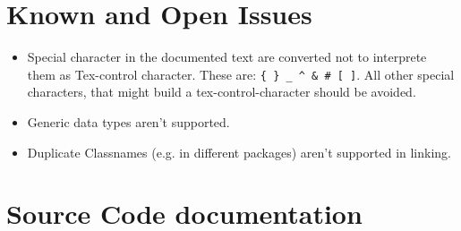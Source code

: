 \documentclass{article}
\begin{document}
\section{Known and Open Issues}
\begin{itemize}
	\item Special character in the documented text are converted not to interprete them as Tex-control character. These are:
\verb+{ } _ ^ & # [ ]+. All other special characters, that might build a tex-control-character should be avoided.
	\item Generic data types aren't supported.
	\item Duplicate Classnames (e.g. in different packages) aren't supported in linking.
\end{itemize}

\section{Source Code documentation}






\end{document}
